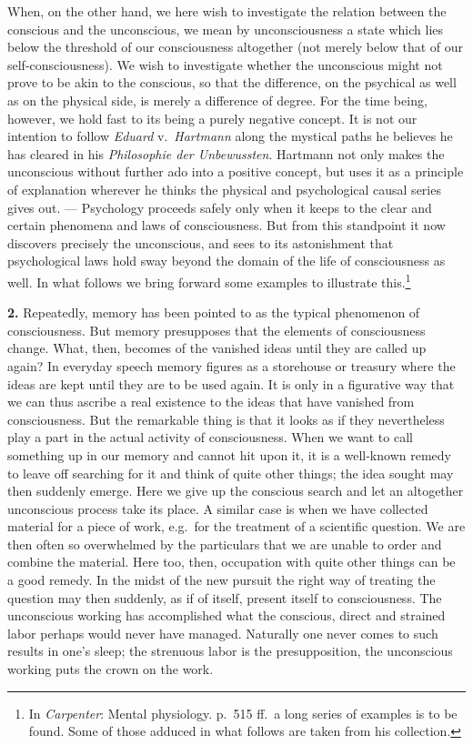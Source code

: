 \documentclass[12pt,a4paper]{book}
\newcommand{\opage}[1]{\marginnote{\footnotesize\textit{[#1]}}}
\begin{document}
When, on the other hand, we here wish to investigate the relation between
the conscious and the unconscious, we mean by unconsciousness a state
which lies below the threshold of our consciousness altogether (not
merely below that of our self-consciousness). We wish to investigate
whether the unconscious
\opage{87}might not prove to be akin to the conscious, so that the
difference, on the psychical as well as on the physical side, is merely
a difference of degree. For the time being, however, we hold fast to its
being a purely negative concept. It is not our intention to follow
\emph{Eduard} v.~\emph{Hartmann} along the mystical paths he believes he
has cleared in his \textit{Philosophie der Unbewussten}. Hartmann not only
makes the unconscious without further ado into a positive concept, but
uses it as a principle of explanation wherever he thinks the physical
and psychological causal series gives out. --- Psychology proceeds safely
only when it keeps to the clear and certain phenomena and laws of
consciousness. But from this standpoint it now discovers precisely the
unconscious, and sees to its astonishment that psychological laws hold
sway beyond the domain of the life of consciousness as well. In what
follows we bring forward some examples to illustrate
this.\footnote{In \emph{Carpenter}: Mental physiology. p.~515 ff.\ a
long series of examples is to be found. Some of those adduced in what
follows are taken from his collection.}

\textbf{2.} Repeatedly, memory has been pointed to as the typical
phenomenon of consciousness. But memory presupposes that the elements of
consciousness change. What, then, becomes of the vanished ideas until
they are called up again? In everyday speech memory figures as a
storehouse or treasury where the ideas are kept until they are to be
used again. It is only in a figurative way that we can thus ascribe a
real existence to the ideas that have vanished from consciousness. But
the remarkable thing is that it looks as if they nevertheless play a part
in the actual activity of consciousness. When we want to call something
up in our memory and cannot hit upon it, it is a well-known remedy to
leave off searching for it and think of quite other things; the idea
sought may then suddenly emerge. Here we give up the conscious search and
let an altogether unconscious process take its place. A similar case is
when we have collected material for a piece of work, e.g.\ for the
treatment of a scientific question. We are then often so overwhelmed by
the particulars that we are unable to order and combine the material.
Here too, then,
\opage{88}occupation with quite other things can be a good remedy. In the
midst of the new pursuit the right way of treating the question may then
suddenly, as if of itself, present itself to consciousness. The
unconscious working has accomplished what the conscious, direct and
strained labor perhaps would never have managed. Naturally one never
comes to such results in one's sleep; the strenuous labor is the
presupposition, the unconscious working puts the crown on the work.
\end{document}
